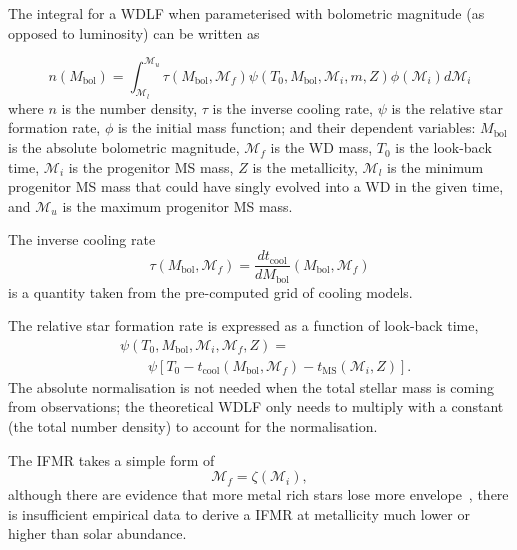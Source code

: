 \documentclass[fleqn,usenatbib]{rasti}
\begin{document}
The integral for a WDLF when parameterised with bolometric magnitude (as
opposed to luminosity) can be written as

\begin{equation}
    n(M_{\mathrm{bol}}) = \int_{\mathcal{M}_l}^{\mathcal{M}_u}
        \tau(M_\mathrm{bol}, \mathcal{M}_f)
        \psi(T_0, M_\mathrm{bol}, \mathcal{M}_i, m, Z)
        \phi(\mathcal{M}_i) d\mathcal{M}_i
\end{equation}
where $n$ is the number density, $\tau$ is the inverse cooling rate, $\psi$ is
the relative star formation rate, $\phi$ is the initial mass function; and their
dependent variables: $M_\mathrm{bol}$ is the absolute bolometric
magnitude, $\mathcal{M}_f$ is the WD mass, $T_0$ is the look-back time, $\mathcal{M}_i$ is
the progenitor MS mass, $Z$ is the metallicity, $\mathcal{M}_l$ is the minimum
progenitor MS mass that could have singly evolved into a WD in the given time,
and $\mathcal{M}_u$ is the maximum progenitor MS mass.

The inverse cooling rate
\begin{equation}
    \tau(M_\mathrm{bol}, \mathcal{M}_f) = \dfrac{dt_{\mathrm{cool}}}{dM_\mathrm{bol}} \left( M_\mathrm{bol}, \mathcal{M}_f \right)
\end{equation}
is a quantity taken from the pre-computed grid of cooling models. 

The relative star formation rate is expressed as a function of look-back time,
\begin{align}
    &\psi(T_0, M_\mathrm{bol}, \mathcal{M}_i, \mathcal{M}_f, Z) =\\
    &\qquad\psi\left[T_0 - t_{\mathrm{cool}}\left(M_\mathrm{bol}, \mathcal{M}_f\right) - t_{\mathrm{MS}}\left(\mathcal{M}_i, Z\right)\right].
\end{align}
The absolute normalisation is not needed when the total stellar mass is coming
from observations; the theoretical WDLF only needs to multiply with a
constant (the total number density) to account for the normalisation.

The IFMR takes a simple form of
\begin{equation}
    \mathcal{M}_f = \zeta(\mathcal{M}_i),
\end{equation}
although there are evidence that more metal rich stars lose more
envelope~\citep{2007ApJ...671..761K}, there is insufficient empirical data to
derive a IFMR at metallicity much lower or higher than solar abundance.
\end{document}

